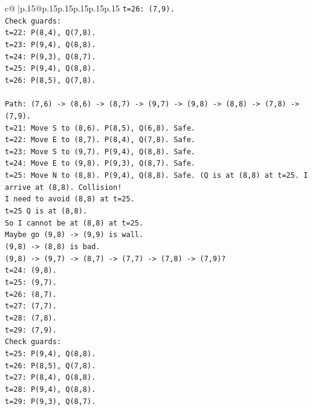 \documentclass{article}
\begin{document}
{\begin{supertabular}{c@{$\;$}|p{.15\linewidth}@{}p{.15\linewidth}p{.15\linewidth}p{.15\linewidth}p{.15\linewidth}p{.15\linewidth}}
{{{\texttt{t=26: (7,9).} \\
\texttt{Check guards:} \\
\texttt{t=22: P(8,4), Q(7,8).} \\
\texttt{t=23: P(9,4), Q(8,8).} \\
\texttt{t=24: P(9,3), Q(8,7).} \\
\texttt{t=25: P(9,4), Q(8,8).} \\
\texttt{t=26: P(8,5), Q(7,8).} \\
\\ 
\texttt{Path: (7,6) {-}> (8,6) {-}> (8,7) {-}> (9,7) {-}> (9,8) {-}> (8,8) {-}> (7,8) {-}> (7,9).} \\
\texttt{t=21: Move S to (8,6). P(8,5), Q(6,8). Safe.} \\
\texttt{t=22: Move E to (8,7). P(8,4), Q(7,8). Safe.} \\
\texttt{t=23: Move S to (9,7). P(9,4), Q(8,8). Safe.} \\
\texttt{t=24: Move E to (9,8). P(9,3), Q(8,7). Safe.} \\
\texttt{t=25: Move N to (8,8). P(9,4), Q(8,8). Safe. (Q is at (8,8) at t=25. I arrive at (8,8). Collision!} \\
\texttt{I need to avoid (8,8) at t=25.} \\
\texttt{t=25 Q is at (8,8).} \\
\texttt{So I cannot be at (8,8) at t=25.} \\
\texttt{Maybe go (9,8) {-}> (9,9) is wall.} \\
\texttt{(9,8) {-}> (8,8) is bad.} \\
\texttt{(9,8) {-}> (9,7) {-}> (8,7) {-}> (7,7) {-}> (7,8) {-}> (7,9)?} \\
\texttt{t=24: (9,8).} \\
\texttt{t=25: (9,7).} \\
\texttt{t=26: (8,7).} \\
\texttt{t=27: (7,7).} \\
\texttt{t=28: (7,8).} \\
\texttt{t=29: (7,9).} \\
\texttt{Check guards:} \\
\texttt{t=25: P(9,4), Q(8,8).} \\
\texttt{t=26: P(8,5), Q(7,8).} \\
\texttt{t=27: P(8,4), Q(8,8).} \\
\texttt{t=28: P(9,4), Q(8,8).} \\
\texttt{t=29: P(9,3), Q(8,7).} \\
\\ 
}}}
\end{supertabular}}
\end{document}
